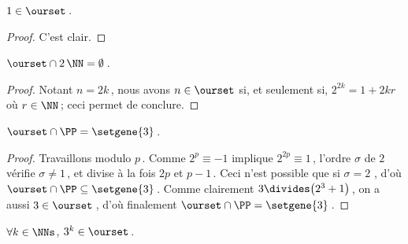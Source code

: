\begin{fact}
	$1 \in \ourset$\,.
\end{fact}

\begin{proof}
	C'est clair.
\end{proof}




\begin{fact} \label{no-even}
	$\ourset \cap 2\,\NN = \emptyset$\,.
\end{fact}

\begin{proof}
	Notant $n = 2 k$\,, nous avons $n \in \ourset$ si, et seulement si, $2^{2 k} = 1 + 2 k r$ où $r \in \NN$\,; ceci permet de conclure.
\end{proof}




\begin{fact} \label{prime-sol}
	$\ourset \cap \PP = \setgene{3}$\,.
\end{fact}

\begin{proof}
	Travaillons modulo $p$\,.
	Comme $2^p \equiv - 1$
	implique
	$2^{2p} \equiv 1$\,,
	l'ordre $\sigma$ de $2$ vérifie $\sigma \neq 1$\,, et divise à la fois $2p$ et $p-1$\,.
	Ceci n'est possible que si $\sigma = 2$ , d'où $\ourset \cap \PP \subseteq \setgene{3}$\,.
	Comme clairement $3 \divides \big( 2^3 + 1 \big)$\,, on a aussi $3 \in \ourset$\,, d'où finalement $\ourset \cap \PP = \setgene{3}$\,.
\end{proof}




\begin{fact} \label{power-of-3}
	$\forall k \in \NNs$, $3^k \in \ourset$\,.
\end{fact}

